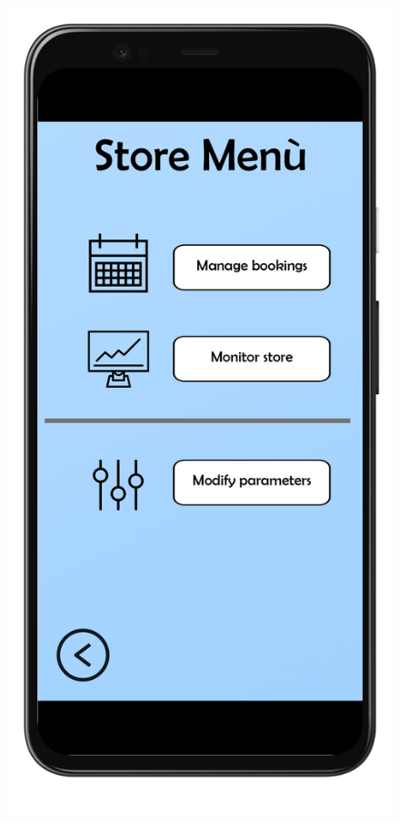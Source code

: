 \documentclass{article}
\begin{document}
		\newpage
		\begin{figure}[!h]
		\begin{minipage}[!h]{0.4\textwidth}
			\includegraphics[width=\textwidth]{../Mockups/MenuStore.png}

\end{minipage}
\end{figure}
\end{document}
